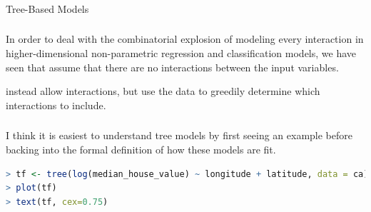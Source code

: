 \documentclass[xetex,mathserif,serif,aspectratio=169]{beamer}
\begin{document}
\begin{frame}[fragile] \frametitle{} \oldB \small

\begin{flushright}
{\color{yaleblue}\sc\fontsize{1cm}{0cm}\selectfont Tree-Based Models}
\end{flushright}

\end{frame}

\begin{frame}[fragile] \frametitle{} \oldB \small

In order to deal with the combinatorial explosion of modeling every
interaction in higher-dimensional non-parametric regression and classification
models, we have seen that  assume that there are
no interactions between the input variables.

\pause {} instead allow interactions, but use the
data to greedily determine which interactions to include.

\end{frame}

\begin{frame}[fragile] \frametitle{} \oldB \small

I think it is easiest to understand tree models by first seeing an example
before backing into the formal definition of how these models are fit.

\begin{lstlisting}[language=R, basicstyle=\ttfamily]
> tf <- tree(log(median_house_value) ~ longitude + latitude, data = ca)
> plot(tf)
> text(tf, cex=0.75)
\end{lstlisting}

\end{frame}
\end{document}
